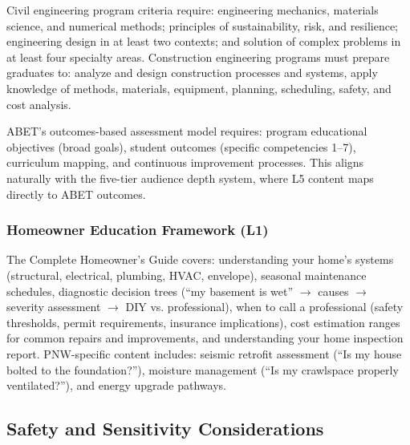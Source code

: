 \documentclass[11pt,letterpaper]{article}
\begin{document}
Civil engineering program criteria require: engineering mechanics, materials science, and numerical methods; principles of sustainability, risk, and resilience; engineering design in at least two contexts; and solution of complex problems in at least four specialty areas. Construction engineering programs must prepare graduates to: analyze and design construction processes and systems, apply knowledge of methods, materials, equipment, planning, scheduling, safety, and cost analysis.

ABET's outcomes-based assessment model requires: program educational objectives (broad goals), student outcomes (specific competencies 1--7), curriculum mapping, and continuous improvement processes. This aligns naturally with the five-tier audience depth system, where L5 content maps directly to ABET outcomes.

\subsubsection{Homeowner Education Framework (L1)}

The Complete Homeowner's Guide covers: understanding your home's systems (structural, electrical, plumbing, HVAC, envelope), seasonal maintenance schedules, diagnostic decision trees (``my basement is wet'' $\rightarrow$ causes $\rightarrow$ severity assessment $\rightarrow$ DIY vs. professional), when to call a professional (safety thresholds, permit requirements, insurance implications), cost estimation ranges for common repairs and improvements, and understanding your home inspection report. PNW-specific content includes: seismic retrofit assessment (``Is my house bolted to the foundation?''), moisture management (``Is my crawlspace properly ventilated?''), and energy upgrade pathways.

\subsection{Safety and Sensitivity Considerations}
\end{document}

